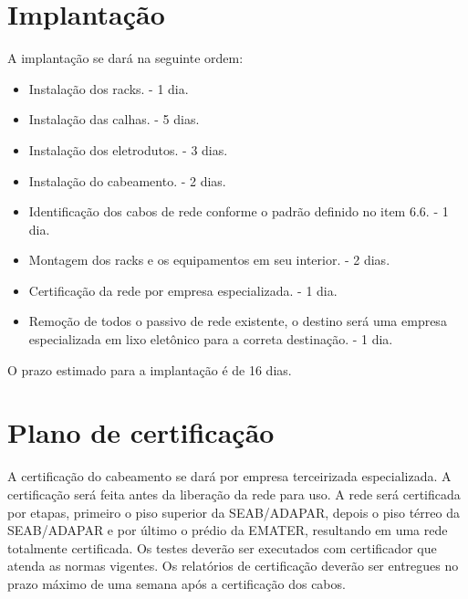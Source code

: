 \documentclass[	DIV=calc,%
							paper=a4,%
							fontsize=12pt,%
							onecolumn]{scrartcl}	 					%
\begin{document}
	
\section{Implantação}



A implantação se dará na seguinte ordem:
\begin{itemize}
	\item Instalação dos racks. - 1 dia.
	\item Instalação das calhas. - 5 dias.
	\item Instalação dos eletrodutos. - 3 dias.
	\item Instalação do cabeamento. - 2 dias.
	\item Identificação dos cabos de rede conforme o padrão definido no item 6.6. - 1 dia.
	\item Montagem dos racks e os equipamentos em seu interior. - 2 dias.
	\item Certificação da rede por empresa especializada. - 1 dia.
	\item Remoção de todos o passivo de rede existente, o destino será uma empresa especializada em lixo eletônico para a correta destinação. - 1 dia.
\end{itemize}
O prazo estimado para a implantação é de 16 dias.

\section{Plano de certificação}
A certificação do cabeamento se dará por empresa terceirizada especializada.
A certificação será feita antes da liberação da rede para uso.
A rede será certificada por etapas, primeiro o piso superior da SEAB/ADAPAR, depois o piso térreo da SEAB/ADAPAR e por último o prédio da EMATER, resultando em uma rede totalmente certificada. 
Os testes deverão ser executados com certificador que atenda as normas vigentes. Os relatórios de certificação deverão ser entregues no prazo máximo de uma semana após a certificação dos cabos.
\end{document}
